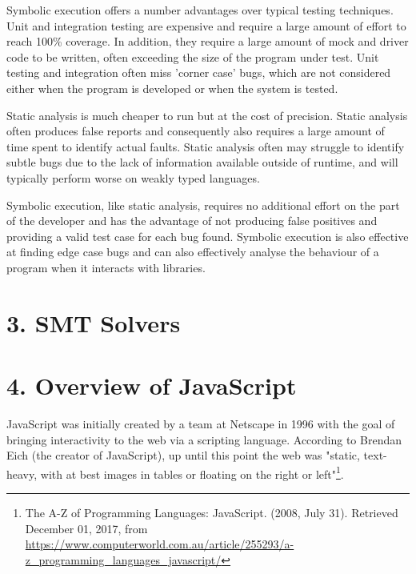 \documentclass[]{article}
\begin{document}
Symbolic execution offers a number advantages over typical testing
techniques. Unit and integration testing are expensive and require a
large amount of effort to reach 100\% coverage. In addition, they
require a large amount of mock and driver code to be written, often
exceeding the size of the program under test. Unit testing and
integration often miss 'corner case' bugs, which are not considered
either when the program is developed or when the system is tested.

Static analysis is much cheaper to run but at the cost of precision.
Static analysis often produces false reports and consequently also
requires a large amount of time spent to identify actual faults. Static
analysis often may struggle to identify subtle bugs due to the lack of
information available outside of runtime, and will typically perform
worse on weakly typed languages.

Symbolic execution, like static analysis, requires no additional effort
on the part of the developer and has the advantage of not producing
false positives and providing a valid test case for each bug found.
Symbolic execution is also effective at finding edge case bugs and can
also effectively analyse the behaviour of a program when it interacts
with libraries.

\hypertarget{header-n114}{%
\section{3. SMT Solvers}\label{header-n114}}

\hypertarget{header-n115}{%
\section{4. Overview of JavaScript}\label{header-n115}}

JavaScript was initially created by a team at Netscape in 1996 with the
goal of bringing interactivity to the web via a scripting language.
According to Brendan Eich (the creator of JavaScript), up until this
point the web was "static, text-heavy, with at best images in tables or
floating on the right or left"\footnote{The A-Z of Programming
  Languages: JavaScript. (2008, July 31). Retrieved December 01, 2017,
  from
  \url{https://www.computerworld.com.au/article/255293/a-z_programming_languages_javascript/}}.
\end{document}
